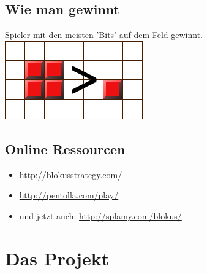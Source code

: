 \documentclass[12pt]{beamer}
\begin{document}
\subsection{Wie man gewinnt}
\begin{frame}
	Spieler mit den meisten 'Bits' auf dem Feld gewinnt.
	\includegraphics[width=0.7\linewidth]{media/how2play6.png}
\end{frame}

\subsection{Online Ressourcen}
\begin{frame}
	\begin{itemize}
		\item \url{http://blokusstrategy.com/}
		\item \url{http://pentolla.com/play/}
		\item und jetzt auch: \url{http://splamy.com/blokus/}
	\end{itemize}
\end{frame}


\section{Das Projekt}
\end{document}
